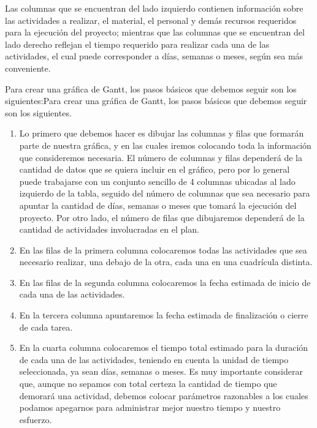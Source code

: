 \documentclass{mylib/reporteCorto}
\begin{document}
Las columnas que se encuentran del lado izquierdo contienen información sobre las actividades a realizar, el material, el personal y demás recursos requeridos para la ejecución del proyecto; mientras que las columnas que se encuentran del lado derecho reflejan el tiempo requerido para realizar cada una de las actividades, el cual puede corresponder a días, semanas o meses, según sea más conveniente.

Para crear una gráfica de Gantt, los pasos básicos que debemos seguir son los siguientes:Para crear una gráfica de Gantt, los pasos básicos que debemos seguir son los siguientes.

\begin{enumerate}
  \item
    Lo primero que debemos hacer es dibujar las columnas y filas que formarán parte de nuestra gráfica, y en las cuales iremos colocando toda la información que consideremos necesaria. El número de columnas y filas dependerá de la cantidad de datos que se quiera incluir en el gráfico, pero por lo general puede trabajarse con un conjunto sencillo de 4 columnas ubicadas al lado izquierdo de la tabla, seguido del número de columnas que sea necesario para apuntar la cantidad de días, semanas o meses que tomará la ejecución del proyecto. Por otro lado, el número de filas que dibujaremos dependerá de la cantidad de actividades involucradas en el plan.

    \item
    En las filas de la primera columna colocaremos todas las actividades que sea necesario realizar, una debajo de la otra, cada una en una cuadrícula distinta.


    \item
    En las filas de la segunda columna colocaremos la fecha estimada de inicio de cada una de las actividades.

    \item
    En la tercera columna apuntaremos la fecha estimada de finalización o cierre de cada tarea.


    \item
    En la cuarta columna colocaremos el tiempo total estimado para la duración de cada una de las actividades, teniendo en cuenta la unidad de tiempo seleccionada, ya sean días, semanas o meses. Es muy importante considerar que, aunque no sepamos con total certeza la cantidad de tiempo que demorará una actividad, debemos colocar parámetros razonables a los cuales podamos apegarnos para administrar mejor nuestro tiempo y nuestro esfuerzo.


\end{enumerate}
\end{document}
